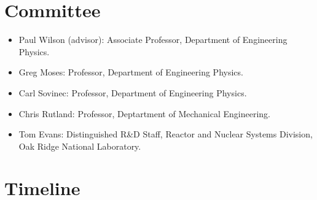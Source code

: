 \documentclass[letterpaper,12pt]{article}
\begin{document}
\section{Committee}

\begin{itemize}
\item Paul Wilson (advisor): Associate Professor, Department of
  Engineering Physics.
\item Greg Moses: Professor, Department of Engineering Physics.
\item Carl Sovinec: Professor, Department of Engineering Physics.
\item Chris Rutland: Professor, Deptartment of Mechanical Engineering.
\item Tom Evans: Distinguished R\&D Staff, Reactor and Nuclear Systems
  Division, Oak Ridge National Laboratory.

\end{itemize}

\section{Timeline}

\pagebreak


\end{document}
